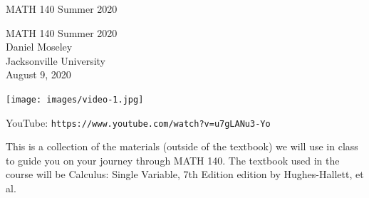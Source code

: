 \documentclass[oneside,10pt,]{book}
\newcommand{\titlepagefont}{\relax}
\newcommand{\mono}[1]{\texttt{#1}}
\numberwithin{equation}{section}
\newlength{\qrsize}
\newlength{\previewwidth}
\begin{document}
\frontmatter
\thispagestyle{empty}
{\titlepagefont\centering
\vspace*{0.28\textheight}
{\Huge MATH 140 Summer 2020}\\}
\clearpage
\thispagestyle{empty}
\null%
\clearpage
\thispagestyle{empty}
{\titlepagefont\centering
\vspace*{0.14\textheight}
{\Huge MATH 140 Summer 2020}\\[3\baselineskip]
{\Large Daniel Moseley}\\[0.5\baselineskip]
{\Large Jacksonville University}\\[3\baselineskip]
{\Large August 9, 2020}\\}
\clearpage
\thispagestyle{empty}
\null\clearpage
\setlength{\qrsize}{9em}
\setlength{\previewwidth}{\linewidth}
\addtolength{\previewwidth}{-\qrsize}
\begin{tcbraster}[raster columns=2, raster column skip=1pt, raster halign=center, raster force size=false, raster left skip=0pt, raster right skip=0pt]%
\begin{tcolorbox}[previewstyle, width=\previewwidth]%
\texttt{[image: images/video-1.jpg]}%
\end{tcolorbox}%
\begin{tcolorbox}[qrstyle]%
{\hypersetup{urlcolor=black}}%
\end{tcolorbox}%
\begin{tcolorbox}[captionstyle]%
\small YouTube: \mono{https://www.youtube.com/watch?v=u7gLANu3-Yo}\end{tcolorbox}%
\end{tcbraster}%
This is a collection of the materials (outside of the textbook) we will use in class to guide you on your journey through MATH 140. The textbook used in the course will be Calculus: Single Variable, 7th Edition edition by Hughes-Hallett, et al.%
\setcounter{tocdepth}{1}
\renewcommand*\contentsname{Contents}
\tableofcontents
\mainmatter
\end{document}
